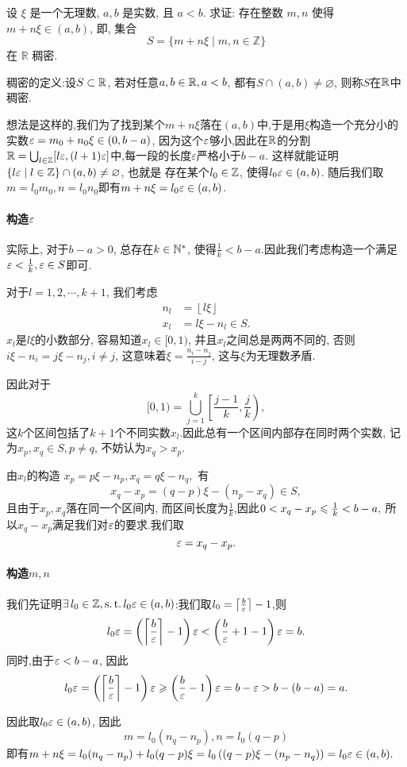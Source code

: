 \begin{exercise}[1.C.16]
    设 $\xi$ 是一个无理数,  $a, b$ 是实数,  且 $a<b$. 求证: 存在整数 $m, n$ 使得 $m+n\xi \in (a, b)$,  即,  集合
    $$ S = \{m+n\xi \mid m,  n \in \mathbb{Z}\} $$
    在 $\mathbb{R}$ 稠密.
\end{exercise}
\begin{solution}
    稠密的定义:设$S\subset \mathbb{R}$, 若对任意$a, b\in\mathbb{R}, a<b$, 都有$S\cap(a, b)\neq\varnothing$, 则称$S$在$\mathbb{R}$中稠密.

    想法是这样的,我们为了找到某个$m+n\xi$落在$(a, b)$中,于是用$\xi$构造一个充分小的实数$\varepsilon = m_0 + n_0 \xi \in \left( 0, {b-a} \right)$, 因为这个$\varepsilon$够小,因此在$\mathbb{R}$的分割$\mathbb{R}=\bigcup_{l\in\mathbb{Z}}[l\varepsilon, (l+1)\varepsilon]$中,每一段的长度$\varepsilon$严格小于$b-a$.
    这样就能证明$\{l \varepsilon \mid l\in\mathbb{Z}\} \cap (a, b) \neq \varnothing$, 也就是
    存在某个$l_0\in\mathbb{Z}$, 使得$l_0\varepsilon\in(a, b)$.
    随后我们取$m=l_0m_0, n=l_0n_0$即有$m+n\xi=l_0\varepsilon\in(a, b)$.

    \paragraph*{构造$\varepsilon$}

    实际上, 对于$b-a>0$, 总存在$k\in\mathbb{N}^*$, 使得$\frac{1}{k}<{b-a}$.因此我们考虑构造一个满足$\varepsilon<\frac{1}{k}, \varepsilon\in S$即可.

    对于$l=1, 2, \cdots, k+1$, 我们考虑
    \begin{align*}
        n_l & =\left\lfloor l\xi \right\rfloor \\
        x_l & =l\xi-n_l \in S.
    \end{align*}
    $x_l$是$l\xi$的小数部分, 容易知道$x_l\in[0, 1)$, 并且$x_l$之间总是两两不同的, 否则$i\xi-n_i=j\xi-n_j, i\neq j$, 这意味着$\xi=\frac{n_i-n_j}{i-j}$, 这与$\xi$为无理数矛盾.

    因此对于$$[0, 1)=\bigcup_{j=1}^{k} \left[ \frac{j-1}{k}, \frac{j}{k} \right), $$
    这$k$个区间包括了$k+1$个不同实数$x_l$.因此总有一个区间内部存在同时两个实数, 记为$x_p, x_q \in S, p\neq q$, 不妨认为$x_q>x_p$.

    由$x_l$的构造 $x_p=p\xi-n_p, x_q=q\xi-n_q,$
    有$$ x_q-x_p=(q-p)\xi-(n_p-x_q)\in S,$$
    且由于$x_p, x_q$落在同一个区间内, 而区间长度为$\frac{1}{k}$,因此$0<x_q-x_p\leqslant\frac{1}{k}< {b-a},$
    所以$x_q-x_p$满足我们对$\varepsilon$的要求.我们取$$\varepsilon=x_q-x_p.$$

    \paragraph*{构造$m, n$}

    我们先证明$\exists l_0\in\Z, \st l_0\ve\in(a, b)$:我们取$l_0 = \left\lceil \frac{b}{\varepsilon} \right\rceil - 1$,则$$l_0 \varepsilon = \left(\left\lceil \frac{b}{\varepsilon} \right\rceil - 1\right)\varepsilon < \left(\frac{b}{\varepsilon} + 1 - 1\right)\varepsilon = b.$$
    同时,由于$\varepsilon < {b-a}$, 因此$$l_0 \varepsilon = \left(\left\lceil \frac{b}{\varepsilon} \right\rceil - 1\right)\varepsilon \geqslant \left(\frac{b}{\varepsilon} - 1\right)\varepsilon = b - \varepsilon > b - (b-a) = a.$$

    因此取$l_0\varepsilon\in(a, b)$, 因此$$m=l_0(n_q-n_p), n=l_0(q-p)$$
    即有$m+n\xi=l_0 (n_q-n_p)+l_0(q-p)\xi=l_0 \left( (q-p)\xi-(n_p-n_q) \right)=l_0\varepsilon\in(a, b).$
\end{solution}

\newpage